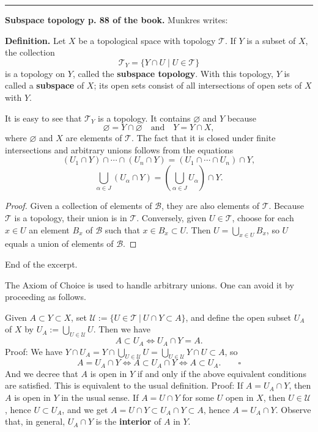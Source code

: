 \documentclass[12pt,letterpaper]{article}
\newcommand{\hs}{\bigskip\hrule\medskip}
\newcommand{\mc}{\mathcal}
\newcommand{\noi}{\noindent}%
\begin{document}
\hs

\noi\textbf{Subspace topology p. 88 of the book.} Munkres writes: 

\noi\textbf{Definition.} Let $X$ be a topological space with topology $\mathcal{T}$. If $Y$ is a subset of $X$, the collection
\[
\mathcal{T}_Y = \{Y \cap U \mid U \in \mathcal{T}\}
\]
is a topology on $Y$, called the \textbf{subspace topology}. With this topology, $Y$ is called a \textbf{subspace} of $X$; its open sets consist of all intersections of open sets of $X$ with $Y$. %

It is easy to see that $\mathcal{T}_Y$ is a topology. It contains $\varnothing$ and $Y$ because
\[
\varnothing = Y \cap \varnothing \quad \text{and} \quad Y = Y \cap X,
\]
where $\varnothing$ and $X$ are elements of $\mathcal{T}$. The fact that it is closed under finite intersections and arbitrary unions follows from the equations
\[
(U_1 \cap Y) \cap \cdots \cap (U_n \cap Y) = (U_1 \cap \cdots \cap U_n) \cap Y,
\]
\[
\bigcup_{\alpha \in J} (U_\alpha \cap Y) = \left(\bigcup_{\alpha \in J} U_\alpha\right) \cap Y.
\] 

\begin{proof}
Given a collection of elements of $\mathcal{B}$, they are also elements of $\mathcal{T}$. Because $\mathcal{T}$ is a topology, their union is in $\mathcal{T}$. Conversely, given $U \in \mathcal{T}$, choose for each $x \in U$ an element $B_x$ of $\mathcal{B}$ such that $x \in B_x \subset U$. Then $U = \bigcup_{x\in U} B_x$, so $U$ equals a union of elements of $\mathcal{B}$.
\end{proof} 

\noi End of the excerpt. 

The Axiom of Choice is used to handle arbitrary unions. One can avoid it by proceeding as follows. 

Given $A\subset Y\subset X$, set $\mc U:=\{U\in\mc T\ |\ U\cap Y\subset A\}$, and define the open subset $U_A$ of $X$ by $U_A:=\bigcup_{U\in\mc U}U$. Then we have 
$$
A\subset U_A\iff U_A\cap Y=A.
$$ 
Proof: We have $Y\cap U_A=Y\cap\bigcup_{U\in\mc U}U=\bigcup_{U\in\mc U}Y\cap U\subset A$, so 
$$A=U_A\cap Y\iff A\subset U_A\cap Y\iff A\subset U_A.\qquad\square
$$
And we decree that $A$ is open in $Y$ if and only if the above equivalent conditions are satisfied. This is equivalent to the usual definition. Proof: If $A=U_A\cap Y$, then $A$ is open in $Y$ in the usual sense. If $A=U\cap Y$ for some $U$ open in $X$, then $U\in\mc U$, hence $U\subset U_A$, and we get $A=U\cap Y\subset U_A\cap Y\subset A$, hence $A=U_A\cap Y$. Observe that, in general, $U_A\cap Y$ is the \textbf{interior} of $A$ in $Y$. 
\end{document}
